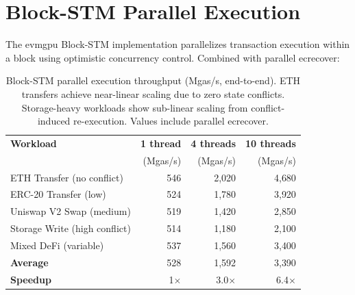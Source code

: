 \section{Block-STM Parallel Execution}


The evmgpu Block-STM implementation parallelizes transaction execution within a block
using optimistic concurrency control. Combined with parallel ecrecover:

\begin{table}[h]
\centering
\small
\begin{tabular}{lrrr}
\toprule
\textbf{Workload} & \textbf{1 thread} & \textbf{4 threads} & \textbf{10 threads} \\
                   & (Mgas/s)          & (Mgas/s)           & (Mgas/s)            \\
\midrule
ETH Transfer (no conflict)    & 546  & 2{,}020 & 4{,}680 \\
ERC-20 Transfer (low)         & 524  & 1{,}780 & 3{,}920 \\
Uniswap V2 Swap (medium)      & 519  & 1{,}420 & 2{,}850 \\
Storage Write (high conflict)  & 514  & 1{,}180 & 2{,}100 \\
Mixed DeFi (variable)          & 537  & 1{,}560 & 3{,}400 \\
\midrule
\textbf{Average}               & 528  & 1{,}592 & 3{,}390 \\
\textbf{Speedup}               & 1$\times$ & 3.0$\times$ & 6.4$\times$ \\
\bottomrule
\end{tabular}
\caption{Block-STM parallel execution throughput (Mgas/s, end-to-end).
ETH transfers achieve near-linear scaling due to zero state conflicts.
Storage-heavy workloads show sub-linear scaling from conflict-induced re-execution.
Values include parallel ecrecover.}
\label{tab:parallel}
\end{table}

